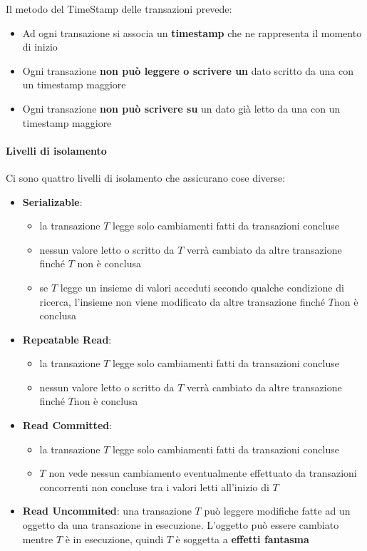 Il metodo del TimeStamp delle transazioni prevede:
\begin{itemize}
	\item Ad ogni transazione si associa un \textbf{timestamp} che ne rappresenta il momento di inizio
	\item Ogni transazione \textbf{non può leggere o scrivere un} dato scritto da una con un timestamp maggiore
	\item Ogni transazione \textbf{non può scrivere su} un dato già letto da una con un timestamp maggiore
\end{itemize}

\paragraph{Livelli di isolamento}
Ci sono quattro livelli di isolamento che assicurano cose diverse:
\begin{itemize}
	\item \textbf{Serializable}: 
	\begin{itemize}
		\item la transazione $T$ legge solo cambiamenti fatti da transazioni concluse
		\item nessun valore letto o scritto da $T$ verrà cambiato da altre transazione finché $T$ non è conclusa
		\item se $T$ legge un insieme di valori acceduti secondo qualche condizione di ricerca, l'insieme non viene
		modificato da altre transazione finché $T$non è conclusa
	\end{itemize}
	\item \textbf{Repeatable Read}:
	\begin{itemize}
		\item la transazione $T$ legge solo cambiamenti fatti da transazioni concluse
		\item nessun valore letto o scritto da $T$ verrà cambiato da altre transazione finché $T$non è conclusa
	\end{itemize}
	\item \textbf{Read Committed}:
	\begin{itemize}
		\item la transazione $T$ legge solo cambiamenti fatti da transazioni concluse
		\item $T$ non vede nessun cambiamento eventualmente effettuato da transazioni concorrenti non concluse tra i valori letti all'inizio di $T$
	\end{itemize}
	\item \textbf{Read Uncommited}: una transazione $T$ può leggere modifiche fatte ad un oggetto da una transazione in esecuzione. L'oggetto può essere cambiato mentre $T$ è in esecuzione, quindi $T$ è soggetta a \textbf{effetti fantasma}
\end{itemize}
